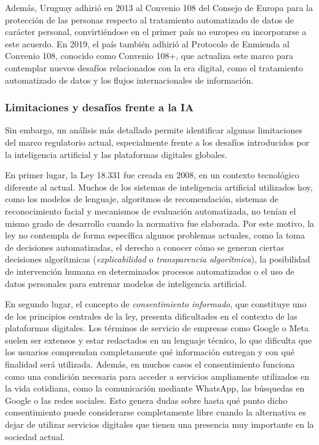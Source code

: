 \documentclass[11pt,a4paper]{article}
\begin{document}
Además, Uruguay adhirió en 2013 al Convenio 108 del Consejo de Europa para la protección de las personas respecto al tratamiento automatizado de datos de carácter personal, convirtiéndose en el primer país no europeo en incorporarse a este acuerdo. En 2019, el país también adhirió al Protocolo de Enmienda al Convenio 108, conocido como Convenio 108+, que actualiza este marco para contemplar nuevos desafíos relacionados con la era digital, como el tratamiento automatizado de datos y los flujos internacionales de información.

\subsubsection{Limitaciones y desafíos frente a la IA}

Sin embargo, un análisis más detallado permite identificar algunas limitaciones del marco regulatorio actual, especialmente frente a los desafíos introducidos por la inteligencia artificial y las plataformas digitales globales.

En primer lugar, la Ley 18.331 fue creada en 2008, en un contexto tecnológico diferente al actual. Muchos de los sistemas de inteligencia artificial utilizados hoy, como los modelos de lenguaje, algoritmos de recomendación, sistemas de reconocimiento facial y mecanismos de evaluación automatizada, no tenían el mismo grado de desarrollo cuando la normativa fue elaborada. Por este motivo, la ley no contempla de forma específica algunos problemas actuales, como la toma de decisiones automatizadas, el derecho a conocer cómo se generan ciertas decisiones algorítmicas (\textit{explicabilidad} o \textit{transparencia algorítmica}), la posibilidad de intervención humana en determinados procesos automatizados o el uso de datos personales para entrenar modelos de inteligencia artificial.

En segundo lugar, el concepto de \textit{consentimiento informado}, que constituye uno de los principios centrales de la ley, presenta dificultades en el contexto de las plataformas digitales. Los términos de servicio de empresas como Google o Meta suelen ser extensos y estar redactados en un lenguaje técnico, lo que dificulta que los usuarios comprendan completamente qué información entregan y con qué finalidad será utilizada. Además, en muchos casos el consentimiento funciona como una condición necesaria para acceder a servicios ampliamente utilizados en la vida cotidiana, como la comunicación mediante WhatsApp, las búsquedas en Google o las redes sociales. Esto genera dudas sobre hasta qué punto dicho consentimiento puede considerarse completamente libre cuando la alternativa es dejar de utilizar servicios digitales que tienen una presencia muy importante en la sociedad actual.
\end{document}
